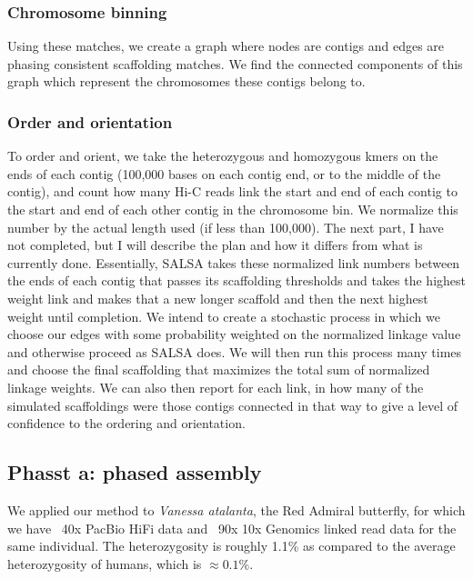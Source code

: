 {\subsubsection{Chromosome binning}

\par{
Using these matches, we create a graph where nodes are contigs and edges are phasing consistent scaffolding matches. We find the connected components of this graph which represent the chromosomes these contigs belong to. 
}

\subsubsection{Order and orientation}

\par{
To order and orient, we take the heterozygous and homozygous kmers on the ends of each contig (100,000 bases on each contig end, or to the middle of the contig), and count how many Hi-C reads link the start and end of each contig to the start and end of each other contig in the chromosome bin. We normalize this number by the actual length used (if less than 100,000). The next part, I have not completed, but I will describe the plan and how it differs from what is currently done. Essentially, SALSA takes these normalized link numbers between the ends of each contig that passes its scaffolding thresholds and takes the highest weight link and makes that a new longer scaffold and then the next highest weight until completion. We intend to create a stochastic process in which we choose our edges with some probability weighted on the normalized linkage value and otherwise proceed as SALSA does. We will then run this process many times and choose the final scaffolding that maximizes the total sum of normalized linkage weights. We can also then report for each link, in how many of the simulated scaffoldings were those contigs connected in that way to give a level of confidence to the ordering and orientation.
}

\subsection{Phasst a: phased assembly}

\par{
We applied our method to \textit{Vanessa atalanta}, the Red Admiral butterfly, for which we have ~40x PacBio HiFi data and ~90x 10x Genomics linked read data for the same individual. The heterozygosity is roughly 1.1\% as compared to the average heterozygosity of humans, which is $\approx0.1\%$.
} \\

}
